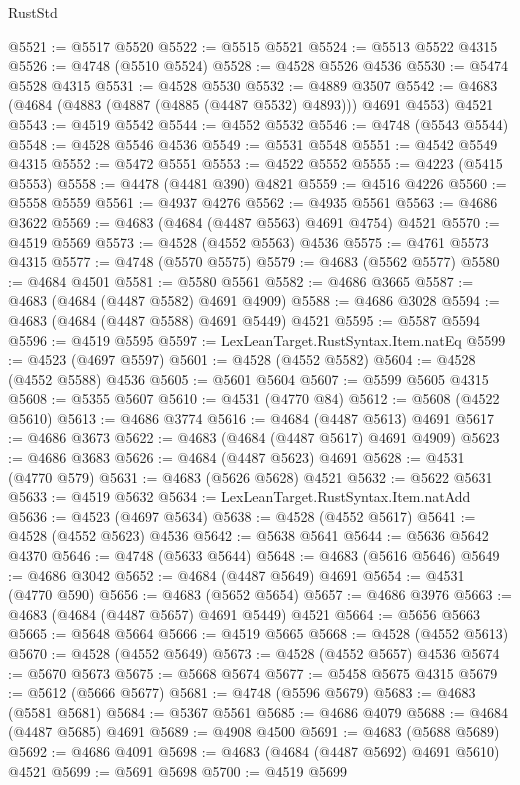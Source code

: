 \begin{lexlean}{RustStd}
\begin{coremodule}
@5521 := @5517 @5520
@5522 := @5515 @5521
@5524 := @5513 @5522 @4315
@5526 := @4748 (@5510 @5524)
@5528 := @4528 @5526 @4536
@5530 := @5474 @5528 @4315
@5531 := @4528 @5530
@5532 := @4889 @3507
@5542 := @4683 (@4684 (@4883 (@4887 (@4885 (@4487 @5532) @4893))) @4691 @4553) @4521
@5543 := @4519 @5542
@5544 := @4552 @5532
@5546 := @4748 (@5543 @5544)
@5548 := @4528 @5546 @4536
@5549 := @5531 @5548
@5551 := @4542 @5549 @4315
@5552 := @5472 @5551
@5553 := @4522 @5552
@5555 := @4223 (@5415 @5553)
@5558 := @4478 (@4481 @390) @4821
@5559 := @4516 @4226
@5560 := @5558 @5559
@5561 := @4937 @4276
@5562 := @4935 @5561
@5563 := @4686 @3622
@5569 := @4683 (@4684 (@4487 @5563) @4691 @4754) @4521
@5570 := @4519 @5569
@5573 := @4528 (@4552 @5563) @4536
@5575 := @4761 @5573 @4315
@5577 := @4748 (@5570 @5575)
@5579 := @4683 (@5562 @5577)
@5580 := @4684 @4501
@5581 := @5580 @5561
@5582 := @4686 @3665
@5587 := @4683 (@4684 (@4487 @5582) @4691 @4909)
@5588 := @4686 @3028
@5594 := @4683 (@4684 (@4487 @5588) @4691 @5449) @4521
@5595 := @5587 @5594
@5596 := @4519 @5595
@5597 := LexLeanTarget.RustSyntax.Item.natEq
@5599 := @4523 (@4697 @5597)
@5601 := @4528 (@4552 @5582)
@5604 := @4528 (@4552 @5588) @4536
@5605 := @5601 @5604
@5607 := @5599 @5605 @4315
@5608 := @5355 @5607
@5610 := @4531 (@4770 @84)
@5612 := @5608 (@4522 @5610)
@5613 := @4686 @3774
@5616 := @4684 (@4487 @5613) @4691
@5617 := @4686 @3673
@5622 := @4683 (@4684 (@4487 @5617) @4691 @4909)
@5623 := @4686 @3683
@5626 := @4684 (@4487 @5623) @4691
@5628 := @4531 (@4770 @579)
@5631 := @4683 (@5626 @5628) @4521
@5632 := @5622 @5631
@5633 := @4519 @5632
@5634 := LexLeanTarget.RustSyntax.Item.natAdd
@5636 := @4523 (@4697 @5634)
@5638 := @4528 (@4552 @5617)
@5641 := @4528 (@4552 @5623) @4536
@5642 := @5638 @5641
@5644 := @5636 @5642 @4370
@5646 := @4748 (@5633 @5644)
@5648 := @4683 (@5616 @5646)
@5649 := @4686 @3042
@5652 := @4684 (@4487 @5649) @4691
@5654 := @4531 (@4770 @590)
@5656 := @4683 (@5652 @5654)
@5657 := @4686 @3976
@5663 := @4683 (@4684 (@4487 @5657) @4691 @5449) @4521
@5664 := @5656 @5663
@5665 := @5648 @5664
@5666 := @4519 @5665
@5668 := @4528 (@4552 @5613)
@5670 := @4528 (@4552 @5649)
@5673 := @4528 (@4552 @5657) @4536
@5674 := @5670 @5673
@5675 := @5668 @5674
@5677 := @5458 @5675 @4315
@5679 := @5612 (@5666 @5677)
@5681 := @4748 (@5596 @5679)
@5683 := @4683 (@5581 @5681)
@5684 := @5367 @5561
@5685 := @4686 @4079
@5688 := @4684 (@4487 @5685) @4691
@5689 := @4908 @4500
@5691 := @4683 (@5688 @5689)
@5692 := @4686 @4091
@5698 := @4683 (@4684 (@4487 @5692) @4691 @5610) @4521
@5699 := @5691 @5698
@5700 := @4519 @5699

\end{coremodule}
\end{lexlean}
